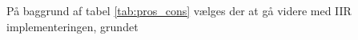 På baggrund af tabel \ref{tab:pros_cons} vælges der at gå videre med IIR implementeringen, grundet 






